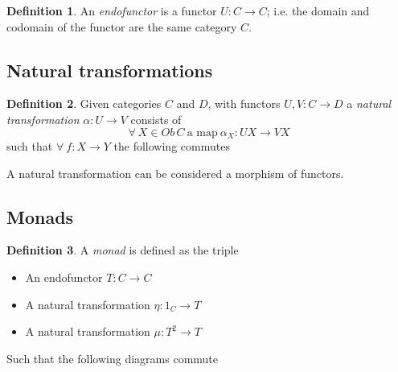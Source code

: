 \documentclass[a4paper,10pt]{article}
\theoremstyle{definition}
\newtheorem{definition}{Definition}[section]
\begin{document}
\begin{definition}
    An \textit{endofunctor} is a functor $U : C \rightarrow C$;
    i.e. the domain and codomain of the functor are the same category $C$.
\end{definition}

\subsection{Natural transformations}
\begin{definition}
    Given categories $C$ and $D$,
    with functors $U, V : C \rightarrow D$
    a \textit{natural transformation} $\alpha : U \rightarrow V$
    consists of
    \begin{equation}
        \forall\ X \in Ob\,C\ \textrm{a map} \ \alpha_X : UX \rightarrow VX
    \end{equation}
    such that $\forall\ f : X \rightarrow Y$ the following commutes
    \begin{center}
    \end{center}
    A natural transformation can be considered a morphism of functors.
\end{definition}

\subsection{Monads}
\begin{definition}
    A \textit{monad} is defined as the triple
    \begin{itemize}
        \item An endofunctor $T : C \rightarrow C$
        \item A natural transformation $\eta : 1_{C} \rightarrow T$
        \item A natural transformation $\mu : T^2 \rightarrow T$
    \end{itemize}
    Such that the following diagrams commute
    \begin{center}
        \quad
    \end{center}
\end{definition}
\end{document}
